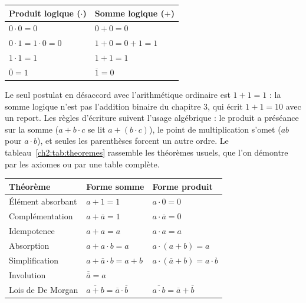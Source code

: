 \begin{center}
\begin{tabular}{C{4.8cm}C{4.8cm}}
\toprule
{}\textbf{Produit logique ($\cdot$)} & \textbf{Somme logique ($+$)}\\
\midrule
$0 \cdot 0 = 0$ & $0 + 0 = 0$\\
$0 \cdot 1 = 1 \cdot 0 = 0$ & $1 + 0 = 0 + 1 = 1$\\
$1 \cdot 1 = 1$ & $1 + 1 = 1$\\
$\overline{0} = 1$ & $\overline{1} = 0$\\
\bottomrule
\end{tabular}
\label{ch2:tab:postulats}
\end{center}

Le seul postulat en désaccord avec l'arithmétique ordinaire est $1 + 1 = 1$ : la somme logique n'est pas l'addition binaire du chapitre 3, qui écrit $1 + 1 = 10$ avec un report. Les règles d'écriture suivent l'usage algébrique : le produit a préséance sur la somme ($a + b \cdot c$ se lit $a + (b \cdot c)$), le point de multiplication s'omet ($ab$ pour $a \cdot b$), et seules les parenthèses forcent un autre ordre. Le tableau~\ref{ch2:tab:theoremes} rassemble les théorèmes usuels, que l'on démontre par les axiomes ou par une table complète.

\begin{center}
\small
\begin{tabular}{L{3.2cm}L{6.0cm}L{6.0cm}}
\toprule
{}\textbf{Théorème} & \textbf{Forme somme} & \textbf{Forme produit}\\
\midrule
Élément absorbant & $a + 1 = 1$ & $a \cdot 0 = 0$\\
Complémentation & $a + \overline{a} = 1$ & $a \cdot \overline{a} = 0$\\
Idempotence & $a + a = a$ & $a \cdot a = a$\\
Absorption & $a + a \cdot b = a$ & $a \cdot (a + b) = a$\\
Simplification & $a + \overline{a} \cdot b = a + b$ & $a \cdot (\overline{a} + b) = a \cdot b$\\
Involution & \\
Lois de De Morgan & $\overline{a + b} = \overline{a} \cdot \overline{b}$ & $\overline{a \cdot b} = \overline{a} + \overline{b}$\\
\bottomrule
\end{tabular}
\label{ch2:tab:theoremes}
\end{center}

